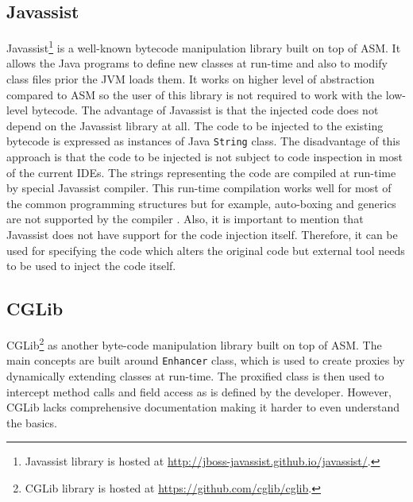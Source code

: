 \subsection{Javassist}
\label{javassist}
Javassist\footnote{Javassist library is hosted at \url{http://jboss-javassist.github.io/javassist/}.} is a well-known bytecode manipulation library built on top of ASM. It allows the Java programs to define new classes at run-time and also to modify class files prior the JVM loads them. It works on higher level of abstraction compared to ASM so the user of this library is not required to work with the low-level bytecode. The advantage of Javassist is that the injected code does not depend on the Javassist library at all. The code to be injected to the existing bytecode is expressed as instances of Java \texttt{String} class. The disadvantage of this approach is that the code to be injected is not subject to code inspection in most of the current IDEs. The strings representing the code are compiled at run-time by special Javassist compiler. This run-time compilation works well for most of the common programming structures but for example, auto-boxing and generics are not supported by the compiler \cite{JAVASSIST}. Also, it is important to mention that Javassist does not have support for the code injection itself. Therefore, it can be used for specifying the code which alters the original code but external tool needs to be used to inject the code itself.
\subsection{CGLib}
\label{cglib}
CGLib\footnote{CGLib library is hosted at \url{https://github.com/cglib/cglib}.} as another byte-code manipulation library built on top of ASM. The main concepts are built around \texttt{Enhancer} class, which is used to create proxies by dynamically extending classes at run-time. The proxified class is then used to intercept method calls and field access as is defined by the developer. However, CGLib lacks comprehensive documentation making it harder to even understand the basics.

